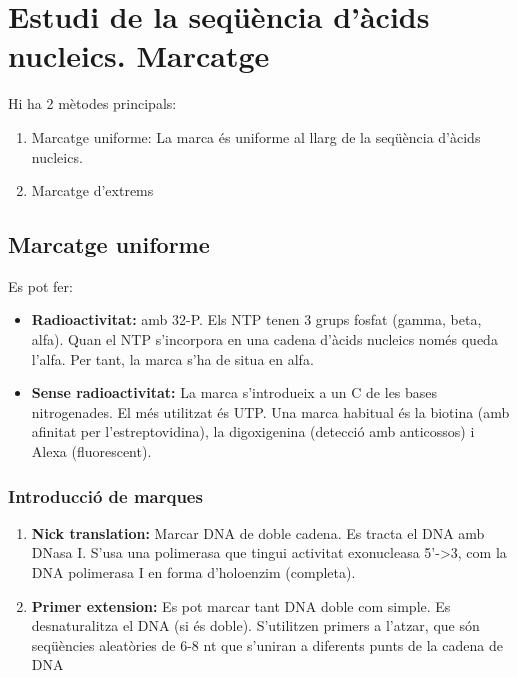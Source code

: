 \section{Estudi de la seqüència d'àcids nucleics. Marcatge}

Hi ha 2 mètodes principals:
\begin{enumerate}
\item Marcatge uniforme: La marca és uniforme al llarg de la seqüència d'àcids nucleics.
\item Marcatge d'extrems
\end{enumerate}

\subsection{Marcatge uniforme}

Es pot fer:
\begin{itemize}
\item \textbf{Radioactivitat:} amb 32-P. Els NTP tenen 3 grups fosfat (gamma, beta, alfa). Quan el NTP s'incorpora en una cadena d'àcids nucleics només queda l'alfa. Per tant, la marca s'ha de situa en alfa.

\item \textbf{Sense radioactivitat:} La marca s'introdueix a un C de les bases nitrogenades. El més utilitzat és UTP. Una marca habitual és la biotina (amb afinitat per l'estreptovidina), la digoxigenina (detecció amb anticossos) i Alexa (fluorescent).
\end{itemize}

\subsubsection{Introducció de marques}
\begin{enumerate}
\item \textbf{Nick translation:} Marcar DNA de doble cadena. Es tracta el DNA amb DNasa I. S'usa una polimerasa que tingui activitat exonucleasa 5'->3, com la DNA polimerasa I en forma d'holoenzim (completa).

\item \textbf{Primer extension:} Es pot marcar tant DNA doble com simple. Es desnaturalitza el DNA (si és doble). S'utilitzen primers a l'atzar, que són seqüències aleatòries de 6-8 nt que s'uniran a diferents punts de la cadena de DNA
\end{enumerate}

